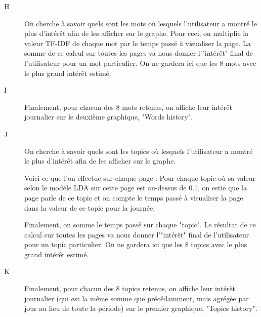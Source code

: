 \begin{description}
			\item[H] On cherche à savoir quels sont les mots où lesquels l'utilisateur a montré le plus d'intérêt afin de les afficher sur le graphe. Pour ceci, on multiplie la valeur TF-IDF de chaque mot par le temps passé à visualiser la page. La somme de ce calcul sur toutes les pages va nous donner l'"intérêt" final de l'utilisateur pour un mot particulier. On ne gardera ici que les 8 mots avec le plus grand intérêt estimé.

			\item[I] Finalement, pour chacun des 8 mots retenus, on affiche leur intérêt journalier sur le deuxième graphique, "Words history".

			\item[J] On cherche à savoir quels sont les topics où lesquels l'utilisateur a montré le plus d'intérêt afin de les afficher sur le graphe.

			Voici ce que l'on effectue sur chaque page : Pour chaque topic où sa valeur selon le modèle LDA sur cette page est au-dessus de 0.1, on estie que la page parle de ce topic et on compte le temps passé à visualiser la page dans la valeur de ce topic pour la journée.

			Finalement, on somme le temps passé sur chaque "topic". Le résultat de ce calcul sur toutes les pages va nous donner l'"intérêt" final de l'utilisateur pour un topic particulier. On ne gardera ici que les 8 topics avec le plus grand intérêt estimé.

			\item[K] Finalement, pour chacun des 8 topics retenus, on affiche leur intérêt journalier (qui est la même somme que précédamment, mais agrégée par jour au lieu de toute la période) sur le premier graphique, "Topics history".
		\end{description}

